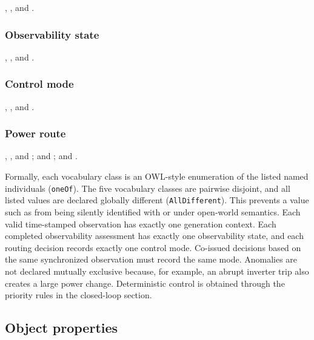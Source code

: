 , , and .

\subsubsection{Observability state}

, , and .

\subsubsection{Control mode}

, , and .

\subsubsection{Power route}

\noindent{}, , and ;\newline
{} and ;\newline
{} and .

Formally, each vocabulary class is an OWL-style enumeration of the listed named individuals (\texttt{oneOf}). The five vocabulary classes are pairwise disjoint, and all listed values are declared globally different (\texttt{AllDifferent}). This prevents a value such as  from being silently identified with  or  under open-world semantics.
Each valid time-stamped observation has exactly one generation context. Each completed observability assessment has exactly one observability state, and each routing decision records exactly one control mode. Co-issued decisions based on the same synchronized observation must record the same mode. Anomalies are not declared mutually exclusive because, for example, an abrupt inverter trip also creates a large power change. Deterministic control is obtained through the priority rules in the closed-loop section.

\subsection{Object properties}

